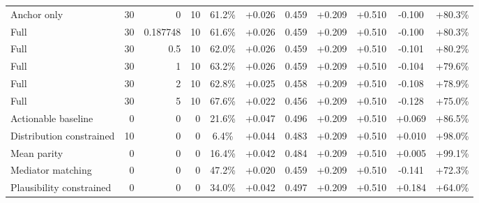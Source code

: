 \begin{table}[htbp]
\begin{tabular}{lrrrccccccc}
Anchor only & 30 & 0 & 10 & 61.2\% & +0.026 & 0.459 & +0.209 & +0.510 & -0.100 & +80.3\% \\
Full & 30 & 0.187748 & 10 & 61.6\% & +0.026 & 0.459 & +0.209 & +0.510 & -0.100 & +80.3\% \\
Full & 30 & 0.5 & 10 & 62.0\% & +0.026 & 0.459 & +0.209 & +0.510 & -0.101 & +80.2\% \\
Full & 30 & 1 & 10 & 63.2\% & +0.026 & 0.459 & +0.209 & +0.510 & -0.104 & +79.6\% \\
Full & 30 & 2 & 10 & 62.8\% & +0.025 & 0.458 & +0.209 & +0.510 & -0.108 & +78.9\% \\
Full & 30 & 5 & 10 & 67.6\% & +0.022 & 0.456 & +0.209 & +0.510 & -0.128 & +75.0\% \\
Actionable baseline & 0 & 0 & 0 & 21.6\% & +0.047 & 0.496 & +0.209 & +0.510 & +0.069 & +86.5\% \\
Distribution constrained & 10 & 0 & 0 & 6.4\% & +0.044 & 0.483 & +0.209 & +0.510 & +0.010 & +98.0\% \\
Mean parity & 0 & 0 & 0 & 16.4\% & +0.042 & 0.484 & +0.209 & +0.510 & +0.005 & +99.1\% \\
Mediator matching & 0 & 0 & 0 & 47.2\% & +0.020 & 0.459 & +0.209 & +0.510 & -0.141 & +72.3\% \\
Plausibility constrained & 0 & 0 & 0 & 34.0\% & +0.042 & 0.497 & +0.209 & +0.510 & +0.184 & +64.0\% \\
\bottomrule
\end{tabular}
\end{table}